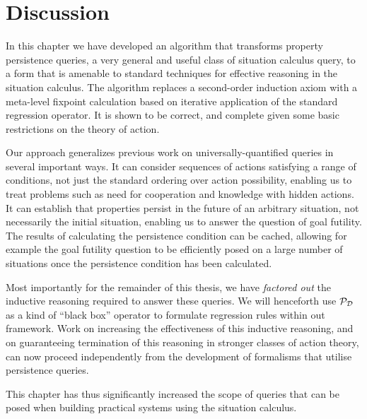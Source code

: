 \section{Discussion\label{sec:Persistence:Discussion}}

In this chapter we have developed an algorithm that transforms property
persistence queries, a very general and useful class of situation
calculus query, to a form that is amenable to standard techniques
for effective reasoning in the situation calculus. The algorithm replaces
a second-order induction axiom with a meta-level fixpoint calculation
based on iterative application of the standard regression operator.
It is shown to be correct, and complete given some basic restrictions
on the theory of action.

Our approach generalizes previous work on universally-quantified queries
in several important ways. It can consider sequences of actions satisfying
a range of conditions, not just the standard ordering over action
possibility, enabling us to treat problems such as need for cooperation
and knowledge with hidden actions. It can establish that properties
persist in the future of an arbitrary situation, not necessarily the
initial situation, enabling us to answer the question of goal futility.
The results of calculating the persistence condition can be cached,
allowing for example the goal futility question to be efficiently
posed on a large number of situations once the persistence condition
has been calculated.

Most importantly for the remainder of this thesis, we have \emph{factored
out} the inductive reasoning required to answer these queries. We
will henceforth use $\mathcal{P}_{\mathcal{D}}$ as a kind of {}``black box'' operator
to formulate regression rules within out framework. Work on increasing
the effectiveness of this inductive reasoning, and on guaranteeing
termination of this reasoning in stronger classes of action theory,
can now proceed independently from the development of formalisms that
utilise persistence queries.

This chapter has thus significantly increased the scope of queries
that can be posed when building practical systems using the situation
calculus.

